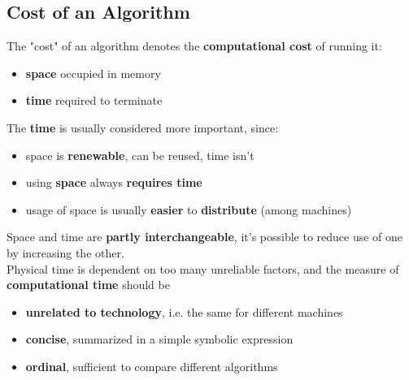 \newpage

\subsection{Cost of an Algorithm}
The "cost" of an algorithm denotes the \textbf{computational cost} of running it: 
\begin{itemize}
	\item \textbf{space} occupied in memory
	\item \textbf{time} required to terminate
\end{itemize}
The \textbf{time} is usually considered more important, since: 
\begin{itemize}
	\item space is \textbf{renewable}, can be reused, time isn't 
	\item using \textbf{space} always \textbf{requires time}
	\item usage of space is usually \textbf{easier} to \textbf{distribute} (among machines)
\end{itemize}
Space and time are \textbf{partly interchangeable}, it's possible to reduce use of one by increasing the other.\\

Physical time is dependent on too many unreliable factors, and the measure of \textbf{computational time} should be 
\begin{itemize}
	\item \textbf{unrelated to technology}, i.e. the same for different machines
	\item \textbf{concise}, summarized in a simple symbolic expression
	\item \textbf{ordinal}, sufficient to compare different algorithms
\end{itemize}

\newpage


